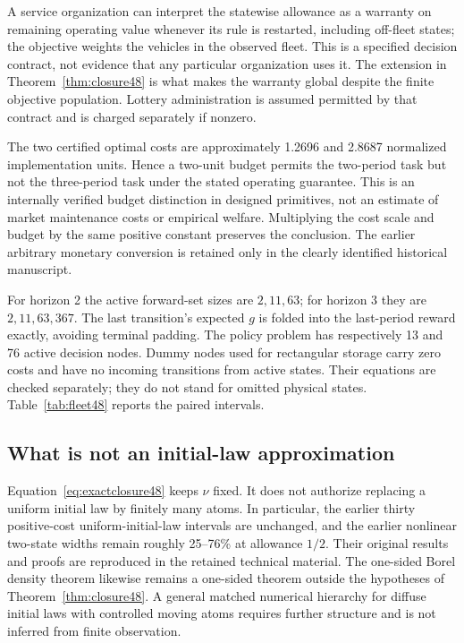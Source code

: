 A service organization can interpret the statewise allowance as a warranty on remaining operating value whenever its rule is restarted, including off-fleet states; the objective weights the vehicles in the observed fleet. This is a specified decision contract, not evidence that any particular organization uses it. The extension in Theorem~\ref{thm:closure48} is what makes the warranty global despite the finite objective population. Lottery administration is assumed permitted by that contract and is charged separately if nonzero.

The two certified optimal costs are approximately 1.2696 and 2.8687 normalized implementation units. Hence a two-unit budget permits the two-period task but not the three-period task under the stated operating guarantee. This is an internally verified budget distinction in designed primitives, not an estimate of market maintenance costs or empirical welfare. Multiplying the cost scale and budget by the same positive constant preserves the conclusion. The earlier arbitrary monetary conversion is retained only in the clearly identified historical manuscript.

For horizon 2 the active forward-set sizes are $2,11,63$; for horizon 3 they are $2,11,63,367$. The last transition's expected $g$ is folded into the last-period reward exactly, avoiding terminal padding. The policy problem has respectively 13 and 76 active decision nodes. Dummy nodes used for rectangular storage carry zero costs and have no incoming transitions from active states. Their equations are checked separately; they do not stand for omitted physical states. Table~\ref{tab:fleet48} reports the paired intervals.

\subsection{What is not an initial-law approximation}
Equation~\eqref{eq:exactclosure48} keeps $\nu$ fixed. It does not authorize replacing a uniform initial law by finitely many atoms. In particular, the earlier thirty positive-cost uniform-initial-law intervals are unchanged, and the earlier nonlinear two-state widths remain roughly 25--76\% at allowance $1/2$. Their original results and proofs are reproduced in the retained technical material. The one-sided Borel density theorem likewise remains a one-sided theorem outside the hypotheses of Theorem~\ref{thm:closure48}. A general matched numerical hierarchy for diffuse initial laws with controlled moving atoms requires further structure and is not inferred from finite observation.
